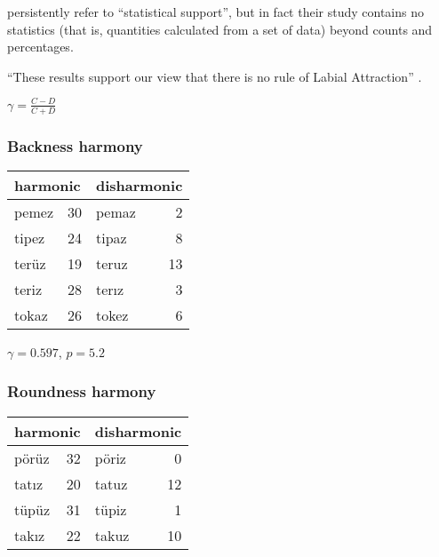 \noindent \citeauthor{Inkelas2001} persistently refer to ``statistical support'', but in fact their study contains no statistics (that is, quantities calculated from a set of data) beyond counts and percentages. 



``These results support our view that there is no rule of Labial Attraction'' \citep[][225]{Clements1982}.


\citet{Goodman1954}

\begin{example}
$\displaystyle \gamma = \frac{C - D}{C + D}$
\end{example}

\subsubsection{Backness harmony}


\begin{example}
\begin{tabular}{l r l r}
\toprule
\multicolumn{2}{l}{harmonic} & \multicolumn{2}{l}{disharmonic} \\
\midrule
pemez & 30                   & pemaz & 2  \\
tipez & 24                   & tipaz & 8  \\ 
terüz & 19                   & teruz & 13 \\ %
teriz & 28                   & terız & 3  \\
tokaz & 26                   & tokez & 6  \\ %
\bottomrule
\end{tabular}
\end{example}

$\gamma = 0.597$, $p = 5.2$

\subsubsection{Roundness harmony}

\begin{example}
\begin{tabular}{l r l r}
\toprule
\multicolumn{2}{l}{harmonic} & \multicolumn{2}{l}{disharmonic} \\
\midrule
pörüz & 32 & pöriz & 0  \\
tatız & 20 & tatuz & 12 \\
tüpüz & 31 & tüpiz & 1  \\
takız & 22 & takuz & 10 \\
\bottomrule
\end{tabular}
\end{example}

